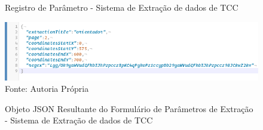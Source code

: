 \begin{figure}[H]
  \centering
  \caption{Registro de Parâmetro - Sistema de Extração de dados de TCC}
  \hfill

\end{figure}

\begin{figure}[H]
\centering
\captionsetup{justification   = raggedright,
              singlelinecheck = false}
\caption{Objeto JSON Resultante do Formulário de Parâmetros de Extração - Sistema de Extração de dados de TCC}\label{jsonParams}
\includegraphics[width=1\textwidth]{figs/jsonParams.png}
\footnotesize Fonte: Autoria Própria
\end{figure}

